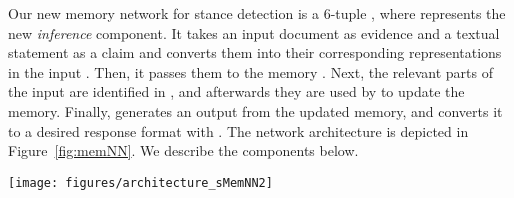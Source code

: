 \documentclass[11pt,a4paper]{article}
\begin{document}
Our new memory network for stance detection is a 6-tuple , where  represents the new \emph{inference} component. It takes an input document  as evidence and a textual statement  as a claim and converts them into their corresponding representations in the input  . Then, it passes them to the memory  . Next, the relevant parts of the input are identified in , and afterwards they are used by  to update the memory. 
Finally,  generates an output from the updated memory, and converts it to a desired response format with . The network architecture is depicted in Figure~\ref{fig:memNN}. We describe the components below.

\begin{figure*}[t]
\centering
\texttt{[image: figures/architecture\_sMemNN2]}\vspace{-.7em}
\caption{The architecture of our Memory Network model for stance detection.}
\label{fig:memNN}
\end{figure*}
\end{document}
